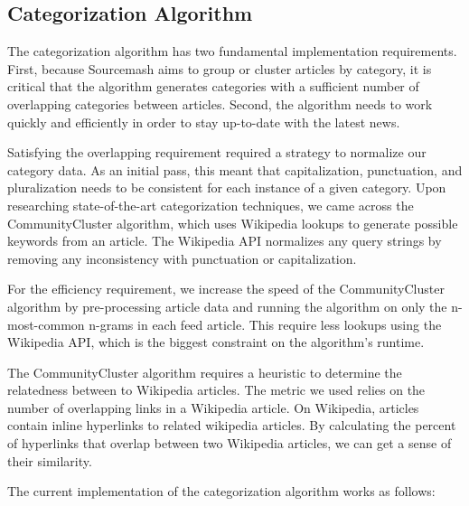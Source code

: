 \documentclass[11pt]{article}
\begin{document}
\subsection{Categorization Algorithm}

The categorization algorithm has two fundamental implementation requirements. First, because Sourcemash aims to group or cluster articles by category, it is critical that the algorithm generates categories with a sufficient number of overlapping categories between articles. Second, the algorithm needs to work quickly and efficiently in order to stay up-to-date with the latest news.

Satisfying the overlapping requirement required a strategy to normalize our category data. As an initial pass, this meant that capitalization, punctuation, and pluralization needs to be consistent for each instance of a given category. Upon researching state-of-the-art categorization techniques, we came across the CommunityCluster algorithm\cite{Grineva}, which uses Wikipedia lookups to generate possible keywords from an article. The Wikipedia API normalizes any query strings by removing any inconsistency with punctuation or capitalization.

For the efficiency requirement, we increase the speed of the CommunityCluster algorithm by pre-processing article data and running the algorithm on only the n-most-common n-grams in each feed article. This require less lookups using the Wikipedia API, which is the biggest constraint on the algorithm's runtime.

The CommunityCluster algorithm requires a heuristic to determine the relatedness between to Wikipedia articles. The metric we used relies on the number of overlapping links in a Wikipedia article. On Wikipedia, articles contain inline hyperlinks to related wikipedia articles. By calculating the percent of hyperlinks that overlap between two Wikipedia articles, we can get a sense of their similarity.

The current implementation of the categorization algorithm works as follows:
\end{document}
